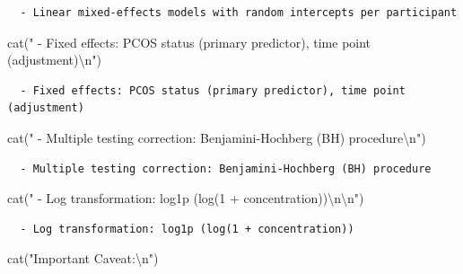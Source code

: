 \documentclass[
  letterpaper,
  DIV=11,
  numbers=noendperiod]{scrartcl}
\newenvironment{Shaded}{\begin{snugshade}}{\end{snugshade}}
\newcommand{\FunctionTok}[1]{\textcolor[rgb]{0.28,0.35,0.67}{#1}}
\newcommand{\NormalTok}[1]{\textcolor[rgb]{0.00,0.23,0.31}{#1}}
\newcommand{\SpecialCharTok}[1]{\textcolor[rgb]{0.37,0.37,0.37}{#1}}
\newcommand{\StringTok}[1]{\textcolor[rgb]{0.13,0.47,0.30}{#1}}
\begin{document}
\begin{verbatim}
  - Linear mixed-effects models with random intercepts per participant
\end{verbatim}

\begin{Shaded}
\begin{Highlighting}[]
\FunctionTok{cat}\NormalTok{(}\StringTok{"  {-} Fixed effects: PCOS status (primary predictor), time point (adjustment)}\SpecialCharTok{\textbackslash{}n}\StringTok{"}\NormalTok{)}
\end{Highlighting}
\end{Shaded}

\begin{verbatim}
  - Fixed effects: PCOS status (primary predictor), time point (adjustment)
\end{verbatim}

\begin{Shaded}
\begin{Highlighting}[]
\FunctionTok{cat}\NormalTok{(}\StringTok{"  {-} Multiple testing correction: Benjamini{-}Hochberg (BH) procedure}\SpecialCharTok{\textbackslash{}n}\StringTok{"}\NormalTok{)}
\end{Highlighting}
\end{Shaded}

\begin{verbatim}
  - Multiple testing correction: Benjamini-Hochberg (BH) procedure
\end{verbatim}

\begin{Shaded}
\begin{Highlighting}[]
\FunctionTok{cat}\NormalTok{(}\StringTok{"  {-} Log transformation: log1p (log(1 + concentration))}\SpecialCharTok{\textbackslash{}n\textbackslash{}n}\StringTok{"}\NormalTok{)}
\end{Highlighting}
\end{Shaded}

\begin{verbatim}
  - Log transformation: log1p (log(1 + concentration))
\end{verbatim}

\begin{Shaded}
\begin{Highlighting}[]
\FunctionTok{cat}\NormalTok{(}\StringTok{"Important Caveat:}\SpecialCharTok{\textbackslash{}n}\StringTok{"}\NormalTok{)}
\end{Highlighting}
\end{Shaded}
\end{document}
